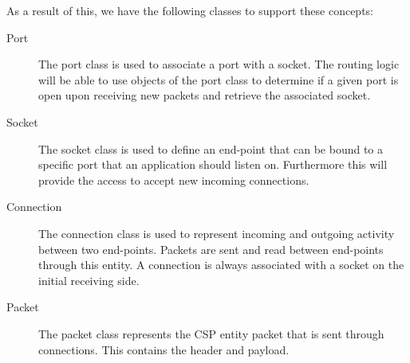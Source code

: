 As a result of this, we have the following classes to support these concepts:
\begin{description}
	\item[Port] The port class is used to associate a port with a socket. The routing logic will be able to use objects of the port class to determine if a given port is open upon receiving new packets and retrieve the associated socket.
	\item[Socket] The socket class is used to define an end-point that can be bound to a specific port that an application should listen on. Furthermore this will provide the access to accept new incoming connections.
	\item[Connection] The connection class is used to represent incoming and outgoing activity between two end-points. Packets are sent and read between end-points through this entity. A connection is always associated with a socket on the initial receiving side.
	\item[Packet] The packet class represents the CSP entity packet that is sent through connections. This contains the header and payload.
\end{description}
